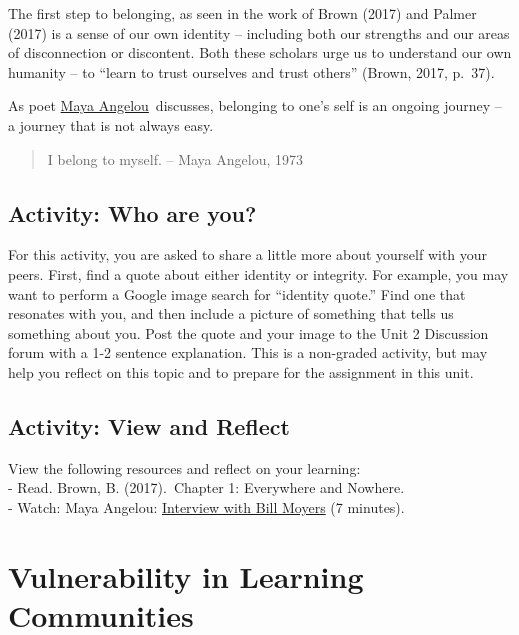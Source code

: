 \documentclass[
]{book}
\begin{document}
The first step to belonging, as seen in the work of Brown (2017) and Palmer (2017) is a sense of our own identity -- including both our strengths and our areas of disconnection or discontent. Both these scholars urge us to understand our own humanity -- to ``learn to trust ourselves and trust others'' (Brown, 2017, p.~37).

As poet \href{http://billmoyers.com/content/conversation-maya-angelou/}{Maya Angelou}~discusses, belonging to one's self is an ongoing journey -- a journey that is not always easy.

\begin{quote}
I belong to myself. -- Maya Angelou, 1973
\end{quote}

\hypertarget{activity-who-are-you}{%
\subsection{Activity: Who are you?}\label{activity-who-are-you}}

\begin{reflect}
For this activity, you are asked to share a little more about yourself
with your peers. First, find a quote about either identity or integrity.
For example, you may want to perform a Google image search for
``identity quote.'' Find one that resonates with you, and then include a
picture of something that tells us something about you. Post the quote
and your image to the Unit 2 Discussion forum with a 1-2 sentence
explanation. This is a non-graded activity, but may help you reflect on
this topic and to prepare for the assignment in this unit.
\end{reflect}

\hypertarget{activity-view-and-reflect}{%
\subsection{Activity: View and Reflect}\label{activity-view-and-reflect}}

\begin{reflect}
View the following resources and reflect on your learning:\\
- Read. Brown, B. (2017).~Chapter 1: Everywhere and Nowhere.\\
- Watch: Maya Angelou:
\href{http://billmoyers.com/content/conversation-maya-angelou/}{Interview
with Bill Moyers} (7 minutes).
\end{reflect}

\hypertarget{vulnerability-in-learning-communities}{%
\section{Vulnerability in Learning Communities}\label{vulnerability-in-learning-communities}}
\end{document}
